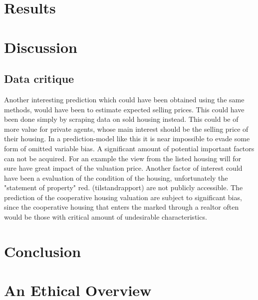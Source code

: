 \documentclass[12pt,a4paper]{article}
\begin{document}
\section{Results}

\section{Discussion}

\subsection{Data critique}
Another interesting prediction which could have been obtained using the same methods, would have been to estimate expected selling prices. This could have been done simply by scraping data on sold housing instead. This could be of more value for private agents, whose main interest should be the selling price of their housing. 
\newline 
In a prediction-model like this it is near impossible to evade some form of omitted variable bias. A significant amount of potential important factors can not be acquired. For an example the view from the listed housing will for sure have great impact of the valuation price. Another factor of interest could have been a evaluation of the condition of the housing, unfortunately the "statement of property" red. (tilstandrapport) are not publicly accessible. \newline
The prediction of the cooperative housing valuation %
are subject to significant bias, since the cooperative housing that enters the marked through a realtor often would be those with critical amount of undesirable characteristics. 
\section{Conclusion}

\section{An Ethical Overview}
\end{document}
